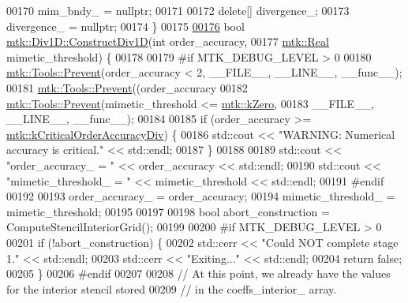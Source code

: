 \begin{DoxyCode}
00170   mim\_bndy\_ = \textcolor{keyword}{nullptr};
00171 
00172   \textcolor{keyword}{delete}[] divergence\_;
00173   divergence\_ = \textcolor{keyword}{nullptr};
00174 \}
00175 
\hypertarget{mtk__div__1d_8cc_source_l00176}{}\hyperlink{classmtk_1_1Div1D_a52fcd1542f11e606e36bd188e48bfdf7}{00176} \textcolor{keywordtype}{bool} \hyperlink{classmtk_1_1Div1D_a52fcd1542f11e606e36bd188e48bfdf7}{mtk::Div1D::ConstructDiv1D}(\textcolor{keywordtype}{int} order\_accuracy,
00177                                 \hyperlink{group__c01-roots_gac080bbbf5cbb5502c9f00405f894857d}{mtk::Real} mimetic\_threshold) \{
00178 
00179 \textcolor{preprocessor}{  #if MTK\_DEBUG\_LEVEL > 0}
00180   \hyperlink{classmtk_1_1Tools_afe5bb096309258e2e72503fd7b41c7e0}{mtk::Tools::Prevent}(order\_accuracy < 2, \_\_FILE\_\_, \_\_LINE\_\_, \_\_func\_\_);
00181   \hyperlink{classmtk_1_1Tools_afe5bb096309258e2e72503fd7b41c7e0}{mtk::Tools::Prevent}((order\_accuracy%
00182   \hyperlink{classmtk_1_1Tools_afe5bb096309258e2e72503fd7b41c7e0}{mtk::Tools::Prevent}(mimetic\_threshold <= \hyperlink{group__c01-roots_ga59a451a5fae30d59649bcda274fea271}{mtk::kZero},
00183                       \_\_FILE\_\_, \_\_LINE\_\_, \_\_func\_\_);
00184 
00185   \textcolor{keywordflow}{if} (order\_accuracy >= \hyperlink{group__c01-roots_ga0898eef2108473e44a5223932d571c31}{mtk::kCriticalOrderAccuracyDiv}) \{
00186     std::cout << \textcolor{stringliteral}{"WARNING: Numerical accuracy is critical."} << std::endl;
00187   \}
00188 
00189   std::cout << \textcolor{stringliteral}{"order\_accuracy\_ = "} << order\_accuracy << std::endl;
00190   std::cout << \textcolor{stringliteral}{"mimetic\_threshold\_ = "} << mimetic\_threshold << std::endl;
00191 \textcolor{preprocessor}{  #endif}
00192 
00193   order\_accuracy\_ = order\_accuracy;
00194   mimetic\_threshold\_ = mimetic\_threshold;
00195 
00197 
00198   \textcolor{keywordtype}{bool} abort\_construction = ComputeStencilInteriorGrid();
00199 
00200 \textcolor{preprocessor}{  #if MTK\_DEBUG\_LEVEL > 0}
00201   \textcolor{keywordflow}{if} (!abort\_construction) \{
00202     std::cerr << \textcolor{stringliteral}{"Could NOT complete stage 1."} << std::endl;
00203     std::cerr << \textcolor{stringliteral}{"Exiting..."} << std::endl;
00204     \textcolor{keywordflow}{return} \textcolor{keyword}{false};
00205   \}
00206 \textcolor{preprocessor}{  #endif}
00207 
00208   \textcolor{comment}{// At this point, we already have the values for the interior stencil stored}
00209   \textcolor{comment}{// in the coeffs\_interior\_ array.}

\end{DoxyCode}
